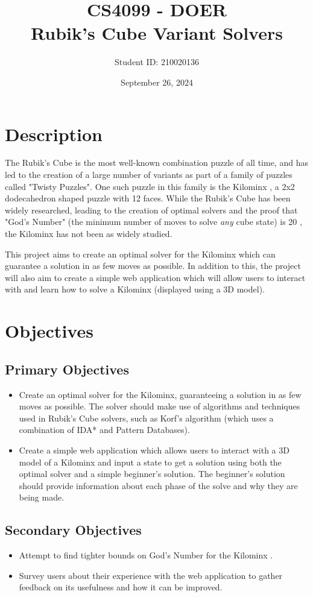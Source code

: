 \documentclass[12pt]{article}
\title{CS4099 - DOER\\Rubik's Cube Variant Solvers}
\author{Student ID: 210020136}
\date{September 26, 2024}
\begin{document}
\maketitle

\section{Description}
The Rubik's Cube \cite{rubikscube} is the most well-known combination puzzle of all time, and has led to the creation of a large number of variants as part of a family of puzzles called "Twisty Puzzles". One such puzzle in this family is the Kilominx \cite{kilominx}, a 2x2 dodecahedron shaped puzzle with 12 faces. While the Rubik's Cube has been widely researched, leading to the creation of optimal solvers and the proof that "God's Number" (the minimum number of moves to solve \textit{any} cube state) is 20 \cite{godsnumber}, the Kilominx has not been as widely studied.

This project aims to create an optimal solver for the Kilominx which can guarantee a solution in as few moves as possible. In addition to this, the project will also aim to create a simple web application which will allow users to interact with and learn how to solve a Kilominx (displayed using a 3D model).

\section{Objectives}
\subsection{Primary Objectives}
\begin{itemize}
    \item Create an optimal solver for the Kilominx, guaranteeing a solution in as few moves as possible. The solver should make use of algorithms and techniques used in Rubik's Cube solvers, such as Korf's algorithm \cite{korf} (which uses a combination of IDA* and Pattern Databases).
    \item Create a simple web application which allows users to interact with a 3D model of a Kilominx and input a state to get a solution using both the optimal solver and a simple beginner's solution. The beginner's solution should provide information about each phase of the solve and why they are being made.
\end{itemize}

\subsection{Secondary Objectives}
\begin{itemize}
    \item Attempt to find tighter bounds on God's Number for the Kilominx \cite{kilominxgodbounds}.
    \item Survey users about their experience with the web application to gather feedback on its usefulness and how it can be improved.
\end{itemize}
\end{document}
